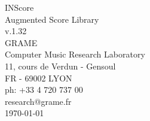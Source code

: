 \documentclass[a4paper]{book}
\begin{document}
\begin{titlepage}
\vspace*{7cm}
\begin{center}
{\huge INScore\\ Augmented Score Library \\[1ex]\large v.1.32}\\
\vspace*{2cm}
{\large GRAME \\ Computer Music Research Laboratory}\\
\vspace*{0.5cm}
{\small 11, cours de Verdun - Gensoul}\\
{\small FR - 69002 LYON}\\
\vspace*{0.5cm}
{\small ph:  +33 4 720 737 00}\\
\vspace*{0.5cm}
{\small research@grame.fr}\\
\vspace*{0.5cm}
\today 
\end{center}
\end{titlepage}
\clearemptydoublepage
{}
\tableofcontents
\clearemptydoublepage
{}
\end{document}
